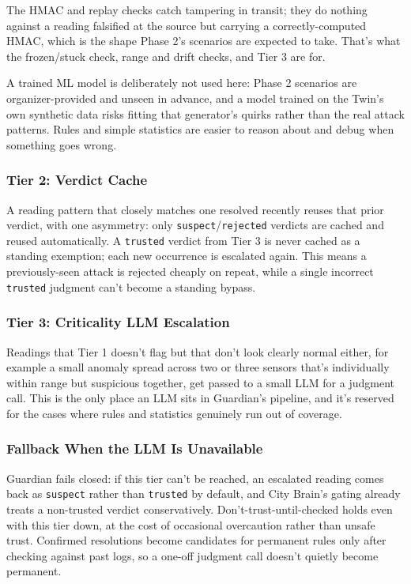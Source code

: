 \documentclass[10pt,letterpaper]{article}
\begin{document}
The HMAC and replay checks catch tampering in transit; they do nothing against a reading falsified at the source but carrying a correctly-computed HMAC, which is the shape Phase 2's scenarios are expected to take. That's what the frozen/stuck check, range and drift checks, and Tier 3 are for.

A trained ML model is deliberately not used here: Phase 2 scenarios are organizer-provided and unseen in advance, and a model trained on the Twin's own synthetic data risks fitting that generator's quirks rather than the real attack patterns. Rules and simple statistics are easier to reason about and debug when something goes wrong.

\subsubsection*{Tier 2: Verdict Cache}

A reading pattern that closely matches one resolved recently reuses that prior verdict, with one asymmetry: only \texttt{suspect}/\texttt{rejected} verdicts are cached and reused automatically. A \texttt{trusted} verdict from Tier 3 is never cached as a standing exemption; each new occurrence is escalated again. This means a previously-seen attack is rejected cheaply on repeat, while a single incorrect \texttt{trusted} judgment can't become a standing bypass.

\subsubsection*{Tier 3: Criticality LLM Escalation}

Readings that Tier 1 doesn't flag but that don't look clearly normal either, for example a small anomaly spread across two or three sensors that's individually within range but suspicious together, get passed to a small LLM for a judgment call. This is the only place an LLM sits in Guardian's pipeline, and it's reserved for the cases where rules and statistics genuinely run out of coverage.

\subsubsection*{Fallback When the LLM Is Unavailable}

Guardian fails closed: if this tier can't be reached, an escalated reading comes back as \texttt{suspect} rather than \texttt{trusted} by default, and City Brain's gating already treats a non-trusted verdict conservatively. Don't-trust-until-checked holds even with this tier down, at the cost of occasional overcaution rather than unsafe trust. Confirmed resolutions become candidates for permanent rules only after checking against past logs, so a one-off judgment call doesn't quietly become permanent.
\end{document}
